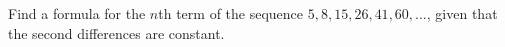Find a formula for the $n$th term of the sequence $5,8,15,26,41,60,\dots$, given that the second differences are constant.
